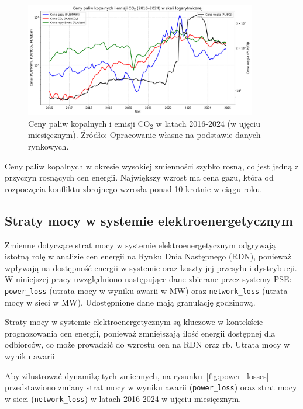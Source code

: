 \begin{figure}[h]
    \centering
    \includegraphics[width=0.9\textwidth]{../plots/fuels/fuel_prices_2016_2024.png}
    \caption{Ceny paliw kopalnych i emisji CO$_2$ w latach 2016-2024 (w ujęciu miesięcznym). Źródło: Opracowanie własne na podstawie danych rynkowych.}
    \label{fig:fuel_prices}
\end{figure}

Ceny paliw kopalnych w okresie wysokiej zmienności szybko rosną, co jest jedną z przyczyn rosnących cen energii. Największy wzrost ma cena gazu, która od rozpoczęcia konfliktu zbrojnego wzrosła ponad 10-krotnie w ciągu roku. 

\subsection{Straty mocy w systemie elektroenergetycznym}
\label{subsec:losses}

Zmienne dotyczące strat mocy w systemie elektroenergetycznym odgrywają istotną rolę w analizie cen energii na Rynku Dnia Następnego (RDN), ponieważ wpływają na dostępność energii w systemie oraz koszty jej przesyłu i dystrybucji. W niniejszej pracy uwzględniono następujące dane zbierane przez systemy PSE: \texttt{power\_loss} (utrata mocy w wyniku awarii w MW) oraz \texttt{network\_loss} (utrata mocy w sieci w MW). Udostępnione dane mają granulację godzinową. 

Straty mocy w systemie elektroenergetycznym są kluczowe w kontekście prognozowania cen energii, ponieważ zmniejszają ilość energii dostępnej dla odbiorców, co może prowadzić do wzrostu cen na RDN oraz \gls{rb}. Utrata mocy w wyniku awarii

Aby zilustrować dynamikę tych zmiennych, na rysunku~\ref{fig:power_losses} przedstawiono zmiany strat mocy w wyniku awarii (\texttt{power\_loss}) oraz strat mocy w sieci (\texttt{network\_loss}) w latach 2016-2024 w ujęciu miesięcznym.

